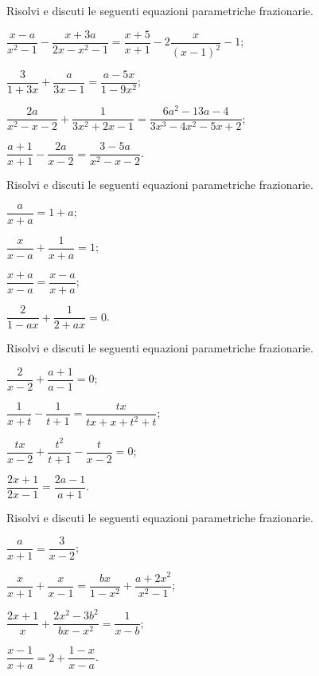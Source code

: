 \begin{esercizio}[\Ast]
\label{ese:20.49}
Risolvi e discuti le seguenti equazioni parametriche frazionarie.
\begin{enumeratea}
 \item $\dfrac{x-a}{x^{2}-1}-\dfrac{x+3a}{2x-x^{2}-1}=\dfrac{x+5}{x+1}-2\dfrac{x}{(x-1)^{2}}-1$;
 \item $\dfrac{3}{1+3x}+\dfrac{a}{3x-1}=\dfrac{a-5x}{1-9x^{2}}$;
 \item $\dfrac{2a}{x^{2}-x-2}+\dfrac{1}{3x^{2}+2x-1}=\dfrac{6a^{2}-13a-4}{3x^{3}-4x^{2}-5x+2}$;
 \item $\dfrac{a+1}{x+1}-\dfrac{2a}{x-2}=\dfrac{3-5a}{x^{2}-x-2}$.
\end{enumeratea}
\end{esercizio}

\begin{esercizio}[\Ast]
\label{ese:20.50}
Risolvi e discuti le seguenti equazioni parametriche frazionarie.
\begin{multicols}{2}
\begin{enumeratea}
 \item $\dfrac{a}{x+a}=1+a$;
 \item $\dfrac{x}{x-a}+\dfrac{1}{x+a}=1$;
 \item $\dfrac{x+a}{x-a}=\dfrac{x-a}{x+a}$;
 \item $\dfrac{2}{1-ax}+\dfrac{1}{2+ax}=0$.
\end{enumeratea}
\end{multicols}
\end{esercizio}

\begin{esercizio}[\Ast]
\label{ese:20.51}
Risolvi e discuti le seguenti equazioni parametriche frazionarie.
\begin{multicols}{2}
\begin{enumeratea}
 \item $\dfrac{2}{x-2}+\dfrac{a+1}{a-1}=0$;
 \item $\dfrac{1}{x+t}-\dfrac{1}{t+1}=\dfrac{tx}{tx+x+t^{2}+t}$;
 \item $\dfrac{tx}{x-2}+\dfrac{t^{2}}{t+1}-\dfrac{t}{x-2}=0$;
 \item $\dfrac{2x+1}{2x-1}=\dfrac{2a-1}{a+1}$.
\end{enumeratea}
\end{multicols}
\end{esercizio}

\begin{esercizio}
\label{ese:20.52}
Risolvi e discuti le seguenti equazioni parametriche frazionarie.
\begin{multicols}{2}
\begin{enumeratea}
 \item $\dfrac{a}{x+1}=\dfrac{3}{x-2}$;
 \item $\dfrac{x}{x+1}+\dfrac{x}{x-1}=\dfrac{bx}{1-x^{2}}+\dfrac{a+2x^{2}}{x^{2}-1}$;
 \item $\dfrac{2x+1}{x}+\dfrac{2x^{2}-3b^{2}}{bx-x^{2}}=\dfrac{1}{x-b}$;
 \item $\dfrac{x-1}{x+a}=2+\dfrac{1-x}{x-a}$.
\end{enumeratea}
\end{multicols}
\end{esercizio}

